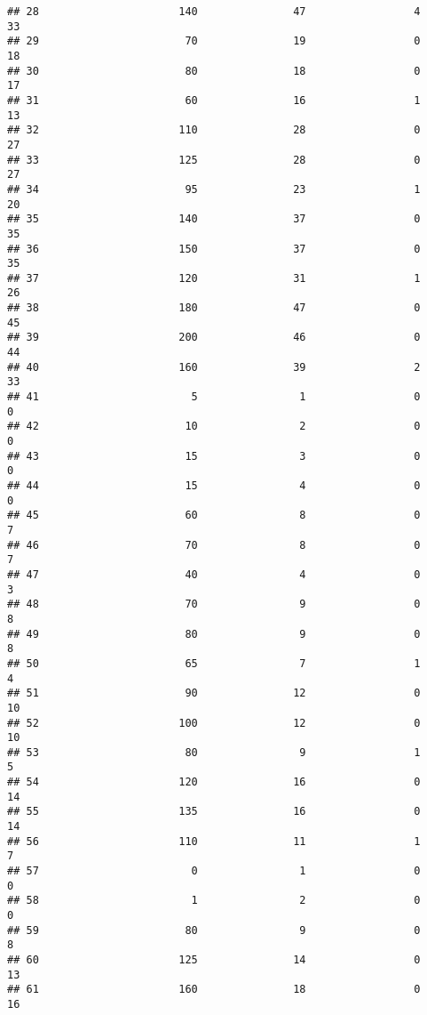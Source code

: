 \documentclass[
]{article}
\begin{document}
\begin{verbatim}
## 28                      140               47                 4         33
## 29                       70               19                 0         18
## 30                       80               18                 0         17
## 31                       60               16                 1         13
## 32                      110               28                 0         27
## 33                      125               28                 0         27
## 34                       95               23                 1         20
## 35                      140               37                 0         35
## 36                      150               37                 0         35
## 37                      120               31                 1         26
## 38                      180               47                 0         45
## 39                      200               46                 0         44
## 40                      160               39                 2         33
## 41                        5                1                 0          0
## 42                       10                2                 0          0
## 43                       15                3                 0          0
## 44                       15                4                 0          0
## 45                       60                8                 0          7
## 46                       70                8                 0          7
## 47                       40                4                 0          3
## 48                       70                9                 0          8
## 49                       80                9                 0          8
## 50                       65                7                 1          4
## 51                       90               12                 0         10
## 52                      100               12                 0         10
## 53                       80                9                 1          5
## 54                      120               16                 0         14
## 55                      135               16                 0         14
## 56                      110               11                 1          7
## 57                        0                1                 0          0
## 58                        1                2                 0          0
## 59                       80                9                 0          8
## 60                      125               14                 0         13
## 61                      160               18                 0         16

\end{verbatim}
\end{document}
